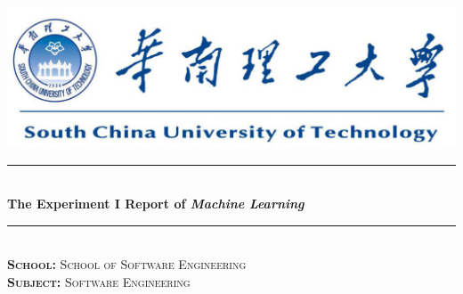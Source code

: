 \documentclass[journal, a4paper]{IEEEtran}
\begin{document}
\begin{titlepage}

\newcommand{\HRule}{\rule{\linewidth}{0.5mm}} %

\center %

~\\[1cm]
\includegraphics{SCUT.png}\\[2cm] %


\HRule \\[1cm]
{ \huge \bfseries The Experiment I Report of \textit{Machine Learning} }\\[0.6cm] %
\HRule \\[2cm]


\textsc{\LARGE \textbf{School:} School of Software Engineering}\\[1cm]
\textsc{\LARGE \textbf{Subject:} Software Engineering}\\[2cm] 

 


\end{titlepage}
\end{document}

